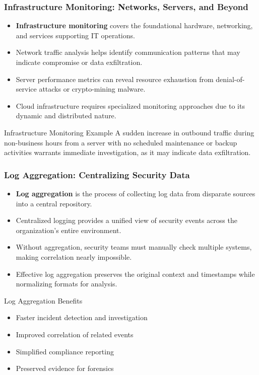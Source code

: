 \documentclass{beamer}
\begin{document}
\begin{frame}
\frametitle{Infrastructure Monitoring: Networks, Servers, and Beyond}
\begin{itemize}
\item \textbf{Infrastructure monitoring} covers the foundational hardware, networking, and services supporting IT operations.
\item Network traffic analysis helps identify communication patterns that may indicate compromise or data exfiltration.
\item Server performance metrics can reveal resource exhaustion from denial-of-service attacks or crypto-mining malware.
\item Cloud infrastructure requires specialized monitoring approaches due to its dynamic and distributed nature.
\end{itemize}

\begin{exampleblock}{Infrastructure Monitoring Example}
A sudden increase in outbound traffic during non-business hours from a server with no scheduled maintenance or backup activities warrants immediate investigation, as it may indicate data exfiltration.
\end{exampleblock}
\end{frame}


\begin{frame}
\frametitle{Log Aggregation: Centralizing Security Data}
\begin{itemize}
\item \textbf{Log aggregation} is the process of collecting log data from disparate sources into a central repository.
\item Centralized logging provides a unified view of security events across the organization's entire environment.
\item Without aggregation, security teams must manually check multiple systems, making correlation nearly impossible.
\item Effective log aggregation preserves the original context and timestamps while normalizing formats for analysis.
\end{itemize}

\begin{block}{Log Aggregation Benefits}
\scriptsize
\begin{itemize}
\item Faster incident detection and investigation
\item Improved correlation of related events
\item Simplified compliance reporting
\item Preserved evidence for forensics
\end{itemize}
\end{block}
\end{frame}
\end{document}
